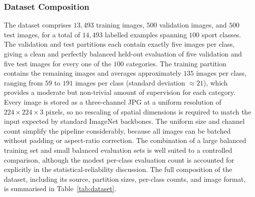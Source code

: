 \subsubsection{Dataset Composition}
\label{subsubsec:method-composition}

The dataset comprises $13{,}493$ training images, $500$ validation images, and $500$ test images, for a total of $14{,}493$ labelled examples spanning $100$ sport classes.
The validation and test partitions each contain exactly five images per class, giving a clean and perfectly balanced held-out evaluation of five validation and five test images for every one of the $100$ categories.
The training partition contains the remaining images and averages approximately $135$ images per class, ranging from $59$ to $191$ images per class (standard deviation $\approx21$), which provides a moderate but non-trivial amount of supervision for each category.
Every image is stored as a three-channel JPG at a uniform resolution of $224\times224\times3$ pixels, so no rescaling of spatial dimensions is required to match the input expected by standard ImageNet backbones.
The uniform size and channel count simplify the pipeline considerably, because all images can be batched without padding or aspect-ratio correction.
The combination of a large balanced training set and small balanced evaluation sets is well suited to a controlled comparison, although the modest per-class evaluation count is accounted for explicitly in the statistical-reliability discussion.
The full composition of the dataset, including its source, partition sizes, per-class counts, and image format, is summarised in Table~\ref{tab:dataset}.


